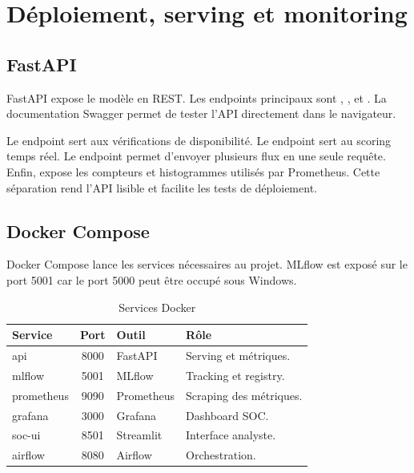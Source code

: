 \chapter{Déploiement, serving et monitoring}

\section{FastAPI}
FastAPI expose le modèle en REST. Les endpoints principaux sont , ,  et . La documentation Swagger permet de tester l'API directement dans le navigateur.

Le endpoint  sert aux vérifications de disponibilité. Le endpoint  sert au scoring temps réel. Le endpoint  permet d'envoyer plusieurs flux en une seule requête. Enfin,  expose les compteurs et histogrammes utilisés par Prometheus. Cette séparation rend l'API lisible et facilite les tests de déploiement.


\section{Docker Compose}
Docker Compose lance les services nécessaires au projet. MLflow est exposé sur le port 5001 car le port 5000 peut être occupé sous Windows.


\begin{table}[H]
\centering
\caption{Services Docker}
\label{tab:services}
\begin{tabularx}{\linewidth}{@{}lclY@{}}
\toprule
\textbf{Service} & \textbf{Port} & \textbf{Outil} & \textbf{Rôle}\\
\midrule
api & 8000 & FastAPI & Serving et métriques.\\
mlflow & 5001 & MLflow & Tracking et registry.\\
prometheus & 9090 & Prometheus & Scraping des métriques.\\
grafana & 3000 & Grafana & Dashboard SOC.\\
soc-ui & 8501 & Streamlit & Interface analyste.\\
airflow & 8080 & Airflow & Orchestration.\\
\bottomrule
\end{tabularx}
\end{table}

